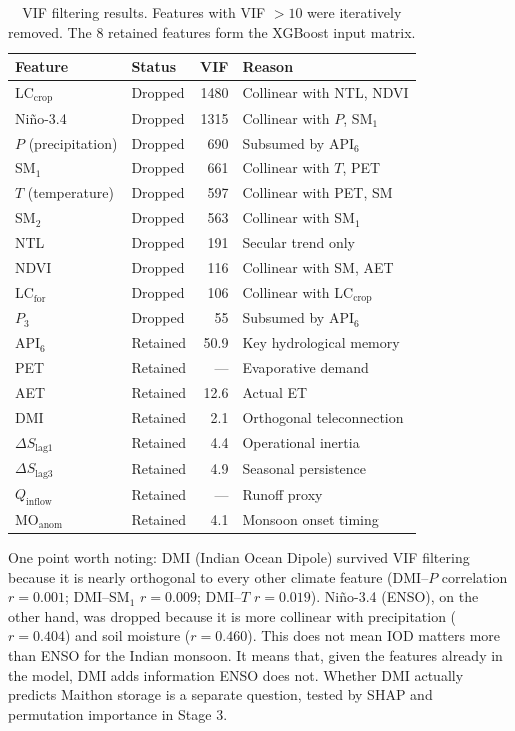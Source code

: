 \documentclass[12pt,a4paper,oneside]{report}
\newcommand{\dS}{\Delta S}
\begin{document}
\begin{table}[htbp]
  \centering
  \caption{VIF filtering results. Features with VIF $> 10$ were iteratively
  removed. The 8 retained features form the XGBoost input matrix.}
  \label{tab:thesis_vif}
  \begin{tabular}{llrl}
    \toprule
    Feature & Status & VIF & Reason \\
    \midrule
    LC$_{\text{crop}}$ & Dropped & 1480 & Collinear with NTL, NDVI \\
    Ni\~{n}o-3.4 & Dropped & 1315 & Collinear with $P$, SM$_1$ \\
    $P$ (precipitation) & Dropped & 690 & Subsumed by API$_6$ \\
    SM$_1$ & Dropped & 661 & Collinear with $T$, PET \\
    $T$ (temperature) & Dropped & 597 & Collinear with PET, SM \\
    SM$_2$ & Dropped & 563 & Collinear with SM$_1$ \\
    NTL & Dropped & 191 & Secular trend only \\
    NDVI & Dropped & 116 & Collinear with SM, AET \\
    LC$_{\text{for}}$ & Dropped & 106 & Collinear with LC$_{\text{crop}}$ \\
    $P_3$ & Dropped & 55 & Subsumed by API$_6$ \\
    \midrule
    API$_6$ & Retained & 50.9 & Key hydrological memory \\
    PET & Retained & --- & Evaporative demand \\
    AET & Retained & 12.6 & Actual ET \\
    DMI & Retained & 2.1 & Orthogonal teleconnection \\
    $\dS_{\text{lag1}}$ & Retained & 4.4 & Operational inertia \\
    $\dS_{\text{lag3}}$ & Retained & 4.9 & Seasonal persistence \\
    $Q_{\text{inflow}}$ & Retained & --- & Runoff proxy \\
    MO$_{\text{anom}}$ & Retained & 4.1 & Monsoon onset timing \\
    \bottomrule
  \end{tabular}
\end{table}

One point worth noting: DMI (Indian Ocean Dipole) survived VIF filtering
because it is nearly orthogonal to every other climate feature
(DMI--$P$ correlation $r = 0.001$; DMI--SM$_1$ $r = 0.009$; DMI--$T$
$r = 0.019$). Ni\~{n}o-3.4 (ENSO), on the other hand, was dropped because
it is more collinear with precipitation ($r = 0.404$) and soil moisture
($r = 0.460$). This does not mean IOD matters more than ENSO for the Indian
monsoon. It means that, given the features already in the model, DMI adds
information ENSO does not. Whether DMI actually predicts Maithon storage is a
separate question, tested by SHAP and permutation importance in Stage 3.
\end{document}
